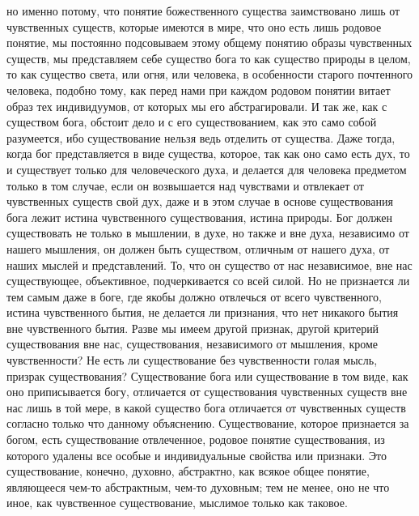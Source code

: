 \documentclass[12pt]{article}
\begin{document}
но именно потому, что понятие божественного существа заимствовано лишь от чувственных существ, которые имеются в мире, что оно есть лишь родовое понятие, мы постоянно подсовываем этому общему понятию образы чувственных существ, мы представляем себе существо бога то как существо природы в целом, то как существо света, или огня, или человека, в особенности старого почтенного человека, подобно тому, как перед нами при каждом родовом понятии витает образ тех индивидуумов, от которых мы его абстрагировали. И так же, как с существом бога, обстоит дело и с его существованием, как это само собой разумеется, ибо существование нельзя ведь отделить от существа. Даже тогда, когда бог представляется в виде существа, которое, так как оно само есть дух, то и существует только для человеческого духа, и делается для человека предметом только в том случае, если он возвышается над чувствами и отвлекает от чувственных существ свой дух, даже и в этом случае в основе существования бога лежит истина чувственного существования, истина природы. Бог должен существовать не только в мышлении, в духе, но также и вне духа, независимо от нашего мышления, он должен быть существом, отличным от нашего духа, от наших мыслей и представлений. То, что он существо от нас независимое, вне нас существующее, объективное, подчеркивается со всей силой. Но не признается ли тем самым даже в боге, где якобы должно отвлечься от всего чувственного, истина чувственного бытия, не делается ли признания, что нет никакого бытия вне чувственного бытия. Разве мы имеем другой признак, другой критерий существования вне нас, существования, независимого от мышления, кроме чувственности? Не есть ли существование без чувственности голая мысль, призрак существования? Существование бога или существование в том виде, как оно приписывается богу, отличается от существования чувственных существ вне нас лишь в той мере, в какой существо бога отличается от чувственных существ согласно только что данному объяснению. Существование, которое признается за богом, есть существование отвлеченное, родовое понятие существования, из которого удалены все особые и индивидуальные свойства или признаки. Это существование, конечно, духовно, абстрактно, как всякое общее понятие, являющееся чем-то абстрактным, чем-то духовным; тем не менее, оно не что иное, как чувственное существование, мыслимое только как таковое. 
\end{document}

